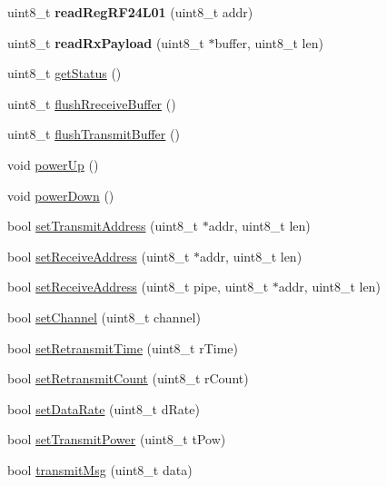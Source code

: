 \begin{DoxyCompactItemize}
uint8\+\_\+t {\bfseries read\+Reg\+R\+F24\+L01} (uint8\+\_\+t addr)
\item 
\mbox{\label{namespace_r_f24_l01_a918df95582a0d0182f11aae2431ea5d5}} 
uint8\+\_\+t {\bfseries read\+Rx\+Payload} (uint8\+\_\+t $\ast$buffer, uint8\+\_\+t len)
\item 
uint8\+\_\+t \mbox{\hyperlink{namespace_r_f24_l01_a37ae626e05545579eee5d81c88601c30}{get\+Status}} ()
\item 
uint8\+\_\+t \mbox{\hyperlink{namespace_r_f24_l01_a38352628295b6668087802280e1c1eb9}{flush\+Rreceive\+Buffer}} ()
\item 
uint8\+\_\+t \mbox{\hyperlink{namespace_r_f24_l01_a531231a2006f852d63ba6d9ca3623f03}{flush\+Transmit\+Buffer}} ()
\item 
void \mbox{\hyperlink{namespace_r_f24_l01_ac3b11b901e092083b61cc98724a504b6}{power\+Up}} ()
\item 
void \mbox{\hyperlink{namespace_r_f24_l01_af818d0549c5506ee31b7807dd0ed8e79}{power\+Down}} ()
\item 
bool \mbox{\hyperlink{namespace_r_f24_l01_a03d3bd840dfe193317329eb84c029685}{set\+Transmit\+Address}} (uint8\+\_\+t $\ast$addr, uint8\+\_\+t len)
\item 
bool \mbox{\hyperlink{namespace_r_f24_l01_adcaf71ba2ff7a89bb25b727e29a3910e}{set\+Receive\+Address}} (uint8\+\_\+t $\ast$addr, uint8\+\_\+t len)
\item 
bool \mbox{\hyperlink{namespace_r_f24_l01_a3c369815f37724dcfb6b7c8c12b25e9f}{set\+Receive\+Address}} (uint8\+\_\+t pipe, uint8\+\_\+t $\ast$addr, uint8\+\_\+t len)
\item 
bool \mbox{\hyperlink{namespace_r_f24_l01_ab75f49984cfbb8815145f85c3b8c2385}{set\+Channel}} (uint8\+\_\+t channel)
\item 
bool \mbox{\hyperlink{namespace_r_f24_l01_a2eb287fa9de64ee6dbe173524a258f47}{set\+Retransmit\+Time}} (uint8\+\_\+t r\+Time)
\item 
bool \mbox{\hyperlink{namespace_r_f24_l01_a13376cc173b2063f033526e7930e3847}{set\+Retransmit\+Count}} (uint8\+\_\+t r\+Count)
\item 
bool \mbox{\hyperlink{namespace_r_f24_l01_a79791c76ac83ff495c95d03db5d008b7}{set\+Data\+Rate}} (uint8\+\_\+t d\+Rate)
\item 
bool \mbox{\hyperlink{namespace_r_f24_l01_a012e78392bee3ef90f145794be638eac}{set\+Transmit\+Power}} (uint8\+\_\+t t\+Pow)
\item 
bool \mbox{\hyperlink{namespace_r_f24_l01_a944fa4d57f52eed6ea60495e11ae533a}{transmit\+Msg}} (uint8\+\_\+t data)

\end{DoxyCompactItemize}
